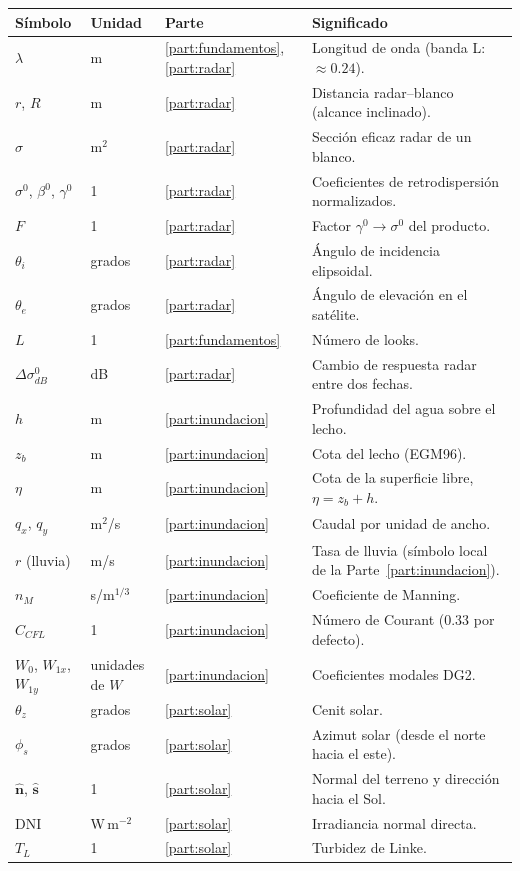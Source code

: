 \documentclass[11pt,a4paper]{article}
\begin{document}
\begin{longtable}{p{.14\linewidth}p{.1\linewidth}p{.18\linewidth}p{.46\linewidth}}
\toprule Símbolo & Unidad & Parte & Significado\\\midrule\endhead
$\lambda$ & m & \ref{part:fundamentos}, \ref{part:radar} & Longitud de onda (banda L: $\approx0.24$).\\
$r$, $R$ & m & \ref{part:radar} & Distancia radar--blanco (alcance inclinado).\\
$\sigma$ & m$^2$ & \ref{part:radar} & Sección eficaz radar de un blanco.\\
$\sigma^0$, $\beta^0$, $\gamma^0$ & 1 & \ref{part:radar} & Coeficientes de retrodispersión normalizados.\\
$F$ & 1 & \ref{part:radar} & Factor $\gamma^0\to\sigma^0$ del producto.\\
$\theta_i$ & grados & \ref{part:radar} & Ángulo de incidencia elipsoidal.\\
$\theta_e$ & grados & \ref{part:radar} & Ángulo de elevación en el satélite.\\
$L$ & 1 & \ref{part:fundamentos} & Número de looks.\\
$\Delta\sigma^0_{dB}$ & dB & \ref{part:radar} & Cambio de respuesta radar entre dos fechas.\\
$h$ & m & \ref{part:inundacion} & Profundidad del agua sobre el lecho.\\
$z_b$ & m & \ref{part:inundacion} & Cota del lecho (EGM96).\\
$\eta$ & m & \ref{part:inundacion} & Cota de la superficie libre, $\eta=z_b+h$.\\
$q_x$, $q_y$ & m$^2$/s & \ref{part:inundacion} & Caudal por unidad de ancho.\\
$r$ (lluvia) & m/s & \ref{part:inundacion} & Tasa de lluvia (símbolo local de la Parte~\ref{part:inundacion}).\\
$n_M$ & s/m$^{1/3}$ & \ref{part:inundacion} & Coeficiente de Manning.\\
$C_{CFL}$ & 1 & \ref{part:inundacion} & Número de Courant (0.33 por defecto).\\
$W_0$, $W_{1x}$, $W_{1y}$ & unidades de $W$ & \ref{part:inundacion} & Coeficientes modales DG2.\\
$\theta_z$ & grados & \ref{part:solar} & Cenit solar.\\
$\phi_s$ & grados & \ref{part:solar} & Azimut solar (desde el norte hacia el este).\\
$\hat{\mathbf n}$, $\hat{\mathbf s}$ & 1 & \ref{part:solar} & Normal del terreno y dirección hacia el Sol.\\
DNI & W\,m$^{-2}$ & \ref{part:solar} & Irradiancia normal directa.\\
$T_L$ & 1 & \ref{part:solar} & Turbidez de Linke.\\\bottomrule
\end{longtable}
\end{document}

